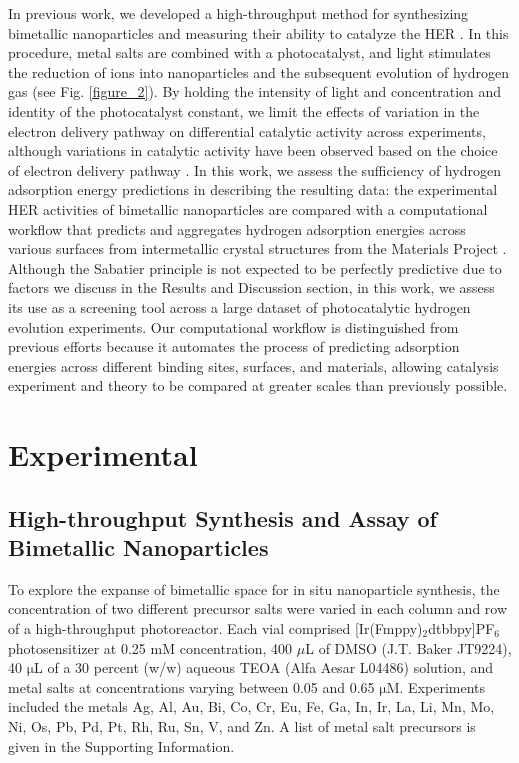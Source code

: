 \documentclass[preprint,12pt]{elsarticle}
\begin{document}
 
In previous work, we developed a high-throughput method for synthesizing bimetallic nanoparticles and measuring their ability to catalyze the HER \cite{lopato2020parallelized,bhat2022accelerated,simon2022ligand}. In this procedure, metal salts are combined with a photocatalyst, and light stimulates the reduction of ions into nanoparticles and the subsequent evolution of hydrogen gas (see Fig. \ref{figure_2}). By holding the intensity of light and concentration and identity of the photocatalyst constant, we limit the effects of variation in the electron delivery pathway on differential catalytic activity across experiments, although variations in catalytic activity have been observed based on the choice of electron delivery pathway \cite{pokhrel2015best}. In this work, we assess the sufficiency of hydrogen adsorption energy predictions in describing the resulting data: the experimental HER activities of bimetallic nanoparticles are compared with a computational workflow that predicts and aggregates hydrogen adsorption energies across various surfaces from intermetallic crystal structures from the Materials Project \cite{ong2013python}. Although the Sabatier principle is not expected to be perfectly predictive due to factors we discuss in the Results and Discussion section, in this work, we assess its use as a screening tool across a large dataset of photocatalytic hydrogen evolution experiments. Our computational workflow is distinguished from previous efforts because it automates the process of predicting adsorption energies across different binding sites, surfaces, and materials, allowing catalysis experiment and theory to be compared at greater scales than previously possible.

\section{Experimental}\label{Section:Experimental}
\subsection{High-throughput Synthesis and Assay of Bimetallic Nanoparticles}
To explore the expanse of bimetallic space for in situ nanoparticle synthesis, the concentration of two different precursor salts were varied in each column and row of a high-throughput photoreactor. Each vial comprised [Ir(Fmppy)$_2$dtbbpy]PF$_6$ photosensitizer at 0.25 mM concentration, 400 $\mu$L of DMSO (J.T. Baker JT9224), 40 $\mathrm{\mu}$L of a 30 percent (w/w) aqueous TEOA (Alfa Aesar L04486) solution, and metal salts at concentrations varying between 0.05 and 0.65 $\mathrm{\mu}$M. Experiments included the metals Ag, Al, Au, Bi, Co, Cr, Eu, Fe, Ga, In, Ir, La, Li, Mn, Mo, Ni, Os, Pb, Pd, Pt, Rh, Ru, Sn, V, and Zn. A list of metal salt precursors is given in the Supporting Information.
\end{document}
